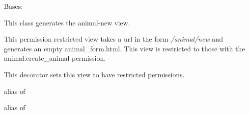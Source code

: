 \documentclass[letterpaper,10pt,english]{sphinxmanual}
\begin{document}
\begin{fulllineitems}
\label{api:mousedb.animal.views.AnimalCreate}
Bases: \href{http://docs.djangoproject.com/en/dev/ref/class-based-views/\#django.views.generic.edit.CreateView}{}

This class generates the animal-new view.

This permission restricted view takes a url in the form \emph{/animal/new} and generates an empty animal\_form.html.
This view is restricted to those with the animal.create\_animal permission.

\begin{fulllineitems}
\label{api:mousedb.animal.views.AnimalCreate.dispatch}
This decorator sets this view to have restricted permissions.

\end{fulllineitems}


\begin{fulllineitems}
\label{api:mousedb.animal.views.AnimalCreate.form_class}
alias of 

\end{fulllineitems}


\begin{fulllineitems}
\label{api:mousedb.animal.views.AnimalCreate.model}
alias of 

\end{fulllineitems}


\begin{fulllineitems}
\label{api:mousedb.animal.views.AnimalCreate.template_name}
\end{fulllineitems}


\end{fulllineitems}

\end{document}
